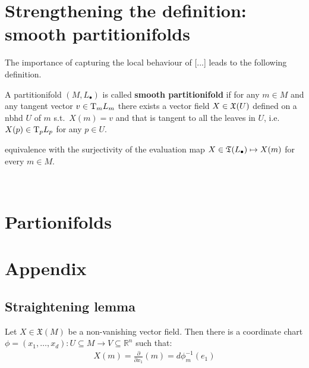 \section{Strengthening the definition: smooth partitionifolds}

	The importance of {\color{Red}capturing the local behaviour of [...]} leads to the following definition.

	\begin{definition}
		A partitionifold $(M, L_\bullet)$ is called \textbf{smooth partitionifold} if for any $m \in M$ and any tangent vector $v \in \mathrm{T}_m L_m$ there exists a vector field $X \in \mathfrak{X}(U)$ defined on a nbhd $U$ of $m$ s.t.\ $X(m) = v$ and that is tangent to all the leaves in $U$, i.e.\ $X(p) \in \mathrm{T}_p L_p$ for any $p \in U$.

	\end{definition}

	\begin{remark}
		equivalence with the surjectivity of the evaluation map $X \in \mathfrak{T}(L_\bullet) \mapsto X(m)$ for every $m \in M$.
	\end{remark}

\newpage
~
\newpage


	\section{Partionifolds}
		

\newpage

\section{Appendix}
        \subsection{Straightening lemma}
        \begin{prop}
            Let $X \in \mathfrak{X}(M)$ be a non-vanishing vector field. Then there is a coordinate chart $\phi = (x_1, \ldots, x_d) : U \subseteq M \to V \subseteq \mathbb{R}^n$ such that:
            \begin{align*}
                X(m) = \frac{\partial}{\partial x_1}(m) = d \phi_m^{-1}(e_1)
            \end{align*}
        \end{prop}
    
